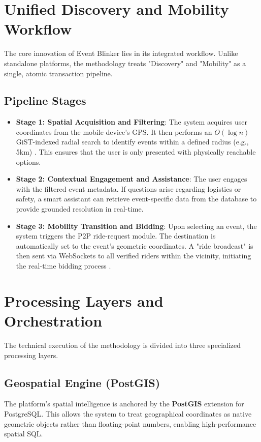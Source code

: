 \section{Unified Discovery and Mobility Workflow}
The core innovation of Event Blinker lies in its integrated workflow. Unlike standalone platforms, the methodology treats "Discovery" and "Mobility" as a single, atomic transaction pipeline.

\subsection{Pipeline Stages}
\begin{itemize}
    \item \textbf{Stage 1: Spatial Acquisition and Filtering}: The system acquires user coordinates from the mobile device's GPS. It then performs an $O(\log n)$ GiST-indexed radial search to identify events within a defined radius (e.g., 5km) \cite{gist}. This ensures that the user is only presented with physically reachable options.
    \item \textbf{Stage 2: Contextual Engagement and Assistance}: The user engages with the filtered event metadata. If questions arise regarding logistics or safety, a smart assistant can retrieve event-specific data from the database to provide grounded resolution in real-time.
    \item \textbf{Stage 3: Mobility Transition and Bidding}: Upon selecting an event, the system triggers the P2P ride-request module. The destination is automatically set to the event's geometric coordinates. A "ride broadcast" is then sent via WebSockets to all verified riders within the vicinity, initiating the real-time bidding process \cite{socketio}.
\end{itemize}

\section{Processing Layers and Orchestration}
The technical execution of the methodology is divided into three specialized processing layers.

\subsection{Geospatial Engine (PostGIS)}
The platform's spatial intelligence is anchored by the \textbf{PostGIS} extension for PostgreSQL. This allows the system to treat geographical coordinates as native geometric objects rather than floating-point numbers, enabling high-performance spatial SQL.

